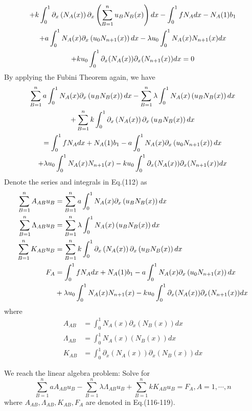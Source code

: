 \begin{solution}
\begin{gather}
		+ k \int_0^1 \partial_{x}\left(N_A(x)\right) \partial_{x}\left( \sum_{B=1}^n u_B N_B(x) \right) dx - \int_0^1 f N_A dx - N_A(1) b_1 \notag \\
		+ a \int_0^1 N_A(x) \partial_{x}\left( u_0 N_{n+1}(x) \right) dx - \lambda u_0 \int_0^1 N_A(x) N_{n+1}(x) dx \notag \\
		+ k u_0 \int_0^1 \partial_{x}(N_A(x)) \partial_{x}(N_{n+1}(x)) dx = 0
	\end{gather}
	By applying the Fubini Theorem again, we have
	\begin{gather}
	    \sum_{B=1}^n a\int_0^1 N_A(x) \partial_{x} \left( u_B N_B(x) \right) dx - \sum_{B=1}^n \lambda \int_0^1 N_A(x) \left( u_B N_B(x) \right) dx \notag \\
	    + \sum_{B=1}^n k \int_0^1 \partial_{x}\left(N_A(x)\right) \partial_{x}\left( u_B N_B(x) \right) dx \notag \\
	    = \int_0^1 f N_A dx + N_A(1) b_1 - a \int_0^1 N_A(x) \partial_{x}\left( u_0 N_{n+1}(x) \right) dx \notag \\
	    + \lambda u_0 \int_0^1 N_A(x) N_{n+1}(x) - k u_0 \int_0^1 \partial_{x}(N_A(x)) \partial_{x}(N_{n+1}(x)) dx
	\end{gather}
	Denote the series and integrals in Eq.(112) as
	\begin{align}
	    \sum_{B=1}^n A_{AB} u_B &= \sum_{B=1}^n a\int_0^1 N_A(x) \partial_{x} \left( u_B N_B(x) \right) dx \\
	    \sum_{B=1}^n \Lambda_{AB} u_B &= \sum_{B=1}^n \lambda \int_0^1 N_A(x) \left( u_B N_B(x) \right) dx \\
	    \sum_{B=1}^n K_{AB} u_B &= \sum_{B=1}^n k \int_0^1 \partial_{x}\left(N_A(x)\right) \partial_{x}\left( u_B N_B(x) \right) dx \\
	    F_A &= \int_0^1 f N_A dx + N_A(1) b_1 - a \int_0^1 N_A(x) \partial_{x}\left( u_0 N_{n+1}(x) \right) dx \notag \\
	    &+ \lambda u_0 \int_0^1 N_A(x) N_{n+1}(x) - k u_0 \int_0^1 \partial_{x}(N_A(x)) \partial_{x}(N_{n+1}(x)) dx
	\end{align}
	where
	\begin{align}
	    A_{AB} &= \int_0^1 N_A(x) \partial_{x} \left( N_B(x) \right) dx \\
	    \Lambda_{AB} &= \int_0^1 N_A(x) \left( N_B(x) \right) dx \\
	    K_{AB} &= \int_0^1 \partial_{x}\left(N_A(x)\right) \partial_{x}\left( N_B(x) \right) dx
	\end{align}
		
		
	\begin{tcolorbox}
		We reach the linear algebra problem: Solve for
		\begin{equation*}
		    \sum_{B=1}^n a A_{AB}u_B - \sum_{B=1}^n \lambda \Lambda_{AB}u_B	+ \sum_{B=1}^n k K_{AB}u_B = F_A, A = 1, \cdots, n
		\end{equation*}
		where $A_{AB}, \Lambda_{AB}, K_{AB}, F_A$ are denoted in Eq.(116-119).
	\end{tcolorbox}
	
\end{solution}